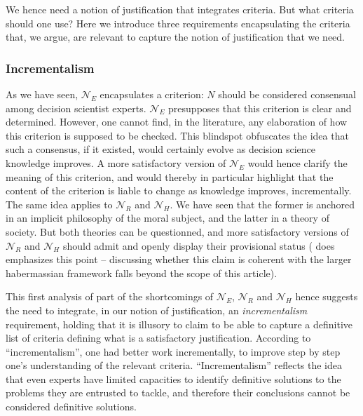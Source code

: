 \documentclass[preprint, french, english, 11pt, authoryear]{elsarticle}%
\begin{document}
We hence need a notion of justification that integrates criteria. But what criteria should one use? Here we introduce three requirements encapsulating the criteria that, we argue, are relevant to capture the notion of justification that we need.

\subsubsection{Incrementalism}
As we have seen, $\mathscr{N}_E$ encapsulates a criterion: $N$ should be considered consensual among decision scientist experts. $\mathscr{N}_E$ presupposes that this criterion is clear and determined. However, one cannot find, in the literature, any elaboration of how this criterion is supposed to be checked. This blindspot obfuscates the idea that such a consensus, if it existed, would certainly evolve as decision science knowledge improves. A more satisfactory version of $\mathscr{N}_E$ would hence clarify the meaning of this criterion, and would thereby in particular highlight that the content of the criterion is liable to change as knowledge improves, incrementally. The same idea applies to $\mathscr{N}_{R}$ and $\mathscr{N}_{H}$. We have seen that the former is anchored in an implicit philosophy of the moral subject, and the latter in a theory of society. But both theories can be questionned, and more satisfactory versions of $\mathscr{N}_{R}$ and $\mathscr{N}_{H}$ should admit and openly display their provisional status (\cite{habermas_moralbewustsein_1983} does emphasizes this point -- discussing whether this claim is coherent with the larger habermassian framework falls beyond the scope of this article).

This first analysis of part of the shortcomings of $\mathscr{N}_E$, $\mathscr{N}_{R}$ and $\mathscr{N}_{H}$ hence suggests the need to integrate, in our notion of justification, an \emph{incrementalism} requirement, holding that it is illusory to claim to be able to capture a definitive list of criteria defining what is a satisfactory justification. According to “incrementalism”, one had better work incrementally, to improve step by step one's understanding of the relevant criteria. “Incrementalism” reflects the idea that even experts have limited capacities to identify definitive solutions to the problems they are entrusted to tackle, and therefore their conclusions cannot be considered definitive solutions.
\end{document}

